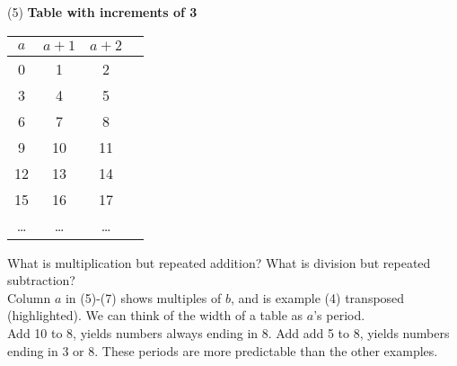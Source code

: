 \begin{minipage}{0.45\textwidth}

    (5) \textbf{Table with increments of 3}\\
    \begin{tabular}{c|ccc}
        $a$                       & $a+1$ & $a+2$ \\
        \hline
        \rowcolor{OliveGreen!10}0 & 1     & 2     \\
        \rowcolor{OliveGreen!10}3 & 4     & 5     \\
        \rowcolor{OliveGreen!10}6 & 7     & 8     \\
        9                         & 10    & 11    \\
        12                        & 13    & 14    \\
        15                        & 16    & 17    \\
        \dots                     & \dots & \dots \\
    \end{tabular}
\end{minipage}%
\hspace{0.05\textwidth} %
\begin{minipage}{0.5\textwidth}
    What is multiplication but repeated addition?
    What is division but repeated subtraction?\\

    \noindent
    Column $a$ in (5)-(7) shows multiples of $b$, and is
    example (4) transposed (highlighted). We can think
    of the width of a table as $a$'s period.\\

    \noindent
    Add 10 to 8, yields numbers always ending in 8.
    Add add 5 to 8, yields numbers ending in 3 or 8.
    These periods are more predictable than the other
    examples.\\

\end{minipage}

\vspace{0.5cm} %

